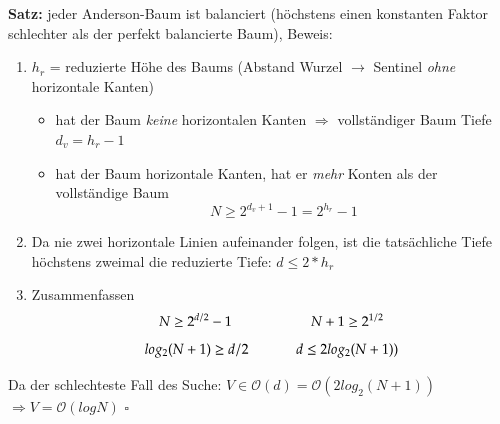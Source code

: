 \documentclass[11pt, fleqn]{scrreprt}
\newcommand{\bigO}[0]{\mathcal{O}}
\begin{document}
\textbf{Satz:} jeder Anderson-Baum ist balanciert (höchstens einen konstanten Faktor schlechter als der perfekt balancierte Baum), Beweis:
\begin{enumerate}
    \item $h_r$ = reduzierte Höhe des Baums (Abstand Wurzel $\rightarrow$ Sentinel \emph{ohne} horizontale Kanten)
    \begin{itemize}
        \item hat der Baum \emph{keine} horizontalen Kanten $\Rightarrow$ vollständiger Baum Tiefe $d_v = h_r - 1$
        \item hat der Baum horizontale Kanten, hat er \emph{mehr} Konten als der vollständige Baum
        \[ N \geq 2^{d_v +1} - 1 = 2^{h_r}-1\]
    \end{itemize}
    \item Da nie zwei horizontale Linien aufeinander folgen, ist die tatsächliche Tiefe höchstens zweimal die reduzierte Tiefe: $d \leq 2 * h_r$
    \item Zusammenfassen
    \[ N \geq 2^{d/2} - 1 \hspace*{2cm} N+1 \geq 2^{1/2} \]
    \[ log_2(N+1) \geq d/2 \hspace*{1.2cm} d \leq 2 log_2(N+1)) \]
\end{enumerate}
Da der schlechteste Fall des Suche: $V \in \bigO{}(d) = \bigO{}(2 log_2(N+1))$\\
\hspace*{6.45cm} $\Rightarrow \boxed{V = \bigO{}(log N)}$ \hspace*{5cm} $\square$ \\
\end{document}
